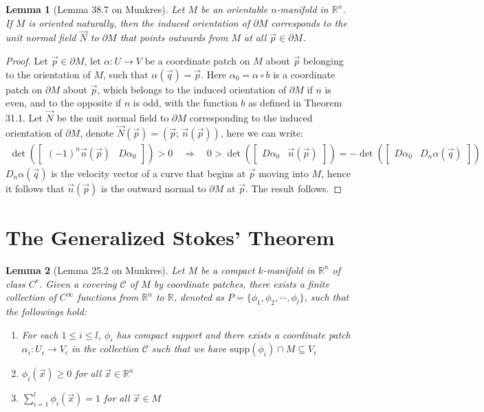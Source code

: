 \documentclass[15pt]{book}
\theoremstyle{break}
\theoremstyle{break}
\newtheorem{lem}{Lemma}[thm]
\newcommand{\R}{\mathbb{R}}
\newcommand{\C}{\mathcal{C}}
\newcommand{\bmat}[1]{\begin{bmatrix} #1 \end{bmatrix}}
\begin{document}
\begin{lem}[Lemma 38.7 on Munkres]
Let $M$ be an orientable $n$-manifold in $\R^n$. If $M$ is oriented naturally, then the induced orientation of $\partial M$ corresponds to the unit normal field $\vec{N}$ to $\partial M$ that points outwards from $M$ at all $\vec{p}\in \partial M$. 
\end{lem}
\begin{proof}
Let $\vec{p}\in \partial M$, let $\alpha:U \to V$ be a coordinate patch on $M$ about $\vec{p}$ belonging to the orientation of $M$, such that $\alpha(\vec{q}) = \vec{p}$. Here $\alpha_0 = \alpha\circ b$ is a coordinate patch on $\partial M$ about $\vec{p}$, which belongs to the induced orientation of $\partial M$ if $n$ is even, and to the opposite if $n$ is odd, with the function $b$ as defined in Theorem 31.1. Let $\vec{N}$ be the unit normal field to $\partial M$ corresponding to the induced orientation of $\partial M$, denote $\vec{N}(\vec{p}) = (\vec{p};\,\vec{n}(\vec{p}))$, here we can write:
\begin{align*}
\det\left(\bmat{(-1)^n\vec{n}(\vec{p}) & D\alpha_0} \right) > 0 
\quad\Rightarrow\quad  0>\det\left(\bmat{D\alpha_0& \vec{n}(\vec{p})} \right)=-\det\left(\bmat{D\alpha_0& D_{n}\alpha(\vec{q})} \right)   
\end{align*}
$D_n\alpha(\vec{q})$ is the velocity vector of a curve that begins at $\vec{p}$ moving into $M$, hence it follows that $\vec{n}(\vec{p})$ is the outward normal to $\partial M$ at $\vec{p}$. The result follows.
\end{proof}

\newpage
\section[The Generalized Stokes' Theorem]{\color{red}The Generalized Stokes' Theorem\color{black}}
\begin{lem}[Lemma 25.2 on Munkres]
Let $M$ be a compact $k$-manifold in $\R^n$ of class $C^r$. Given a covering $\mathcal{C}$ of $M$ by coordinate patches, there exists a finite collection of $C^\infty$ functions from $\R^n$ to $\R$, denoted as $P = \{ \phi_1, \phi_2,\cdots, \phi_l\}$, such that the followings hold:
\begin{enumerate}[topsep=3pt,itemsep=-1ex,partopsep=1ex,parsep=1ex]
\item For each $1\leq i\leq l$, $\phi_i$ has compact support and there exists a coordinate patch $\alpha_i : U_i \to V_i$ in the collection $\C$ such that we have $\text{supp}(\phi_i) \cap M \subseteq V_i$
\item $\phi_i(\vec{x})\geq 0$ for all $\vec{x} \in \R^n$
\item $\sum_{i=1}^l \phi_i(\vec{x}) = 1$ for all $\vec{x}\in M$
\end{enumerate}
\end{lem}
\end{document}
